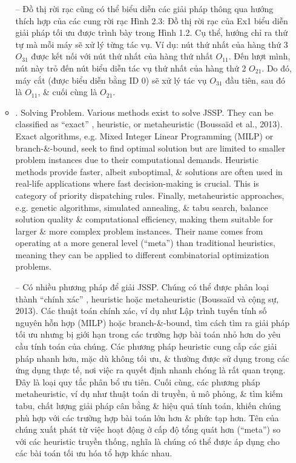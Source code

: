 \documentclass{article}
\begin{document}
\begin{itemize}
\begin{itemize}
        -- Đồ thị rời rạc cũng có thể biểu diễn các giải pháp thông qua hướng thích hợp của các cung rời rạc {\sf Hình 2.3: Đồ thị rời rạc của Ex1 biểu diễn giải pháp tối ưu được trình bày trong Hình 1.2}. Cụ thể, hướng chỉ ra thứ tự mà mỗi máy sẽ xử lý từng tác vụ. Ví dụ: nút thứ nhất của hàng thứ 3 $O_{31}$ được kết nối với nút thứ nhất của hàng thứ nhất $O_{11}$. Đến lượt mình, nút này trỏ đến nút biểu diễn tác vụ thứ nhất của hàng thứ 2 $O_{21}$. Do đó, máy cắt (được biểu diễn bằng ID 0) sẽ xử lý tác vụ $O_{31}$ đầu tiên, sau đó là $O_{11}$, \& cuối cùng là $O_{21}$.
        \item {. Solving Problem.} Various methods exist to solve JSSP. They can be classified as ``exact'' \cite{Korte_Vygen2018}, heuristic, or metaheuristic (Boussaïd et al., 2013). Exact algorithms, e.g. Mixed Integer Linear Programming (MILP) or branch-\&-bound, seek to find optimal solution but are limited to smaller problem instances due to their computational demands. Heuristic methods provide faster, albeit suboptimal, \& solutions are often used in real-life applications where fast decision-making is crucial. This is category of priority dispatching rules. Finally, metaheuristic approaches, e.g. genetic algorithms, simulated annealing, \& tabu search, balance solution quality \& computational efficiency, making them suitable for larger \& more complex problem instances. Their name comes from operating at a more general level (``meta'') than traditional heuristics, meaning they can be applied to different combinatorial optimization problems.

        -- Có nhiều phương pháp để giải JSSP. Chúng có thể được phân loại thành ``chính xác'' \cite{Korte_Vygen2018}, heuristic hoặc metaheuristic (Boussaïd và cộng sự, 2013). Các thuật toán chính xác, ví dụ như Lập trình tuyến tính số nguyên hỗn hợp (MILP) hoặc branch-\&-bound, tìm cách tìm ra giải pháp tối ưu nhưng bị giới hạn trong các trường hợp bài toán nhỏ hơn do yêu cầu tính toán của chúng. Các phương pháp heuristic cung cấp các giải pháp nhanh hơn, mặc dù không tối ưu, \& thường được sử dụng trong các ứng dụng thực tế, nơi việc ra quyết định nhanh chóng là rất quan trọng. Đây là loại quy tắc phân bổ ưu tiên. Cuối cùng, các phương pháp metaheuristic, ví dụ như thuật toán di truyền, ủ mô phỏng, \& tìm kiếm tabu, chất lượng giải pháp cân bằng \& hiệu quả tính toán, khiến chúng phù hợp với các trường hợp bài toán lớn hơn \& phức tạp hơn. Tên của chúng xuất phát từ việc hoạt động ở cấp độ tổng quát hơn (``meta'') so với các heuristic truyền thống, nghĩa là chúng có thể được áp dụng cho các bài toán tối ưu hóa tổ hợp khác nhau.


\end{itemize}
\end{itemize}
\end{document}
